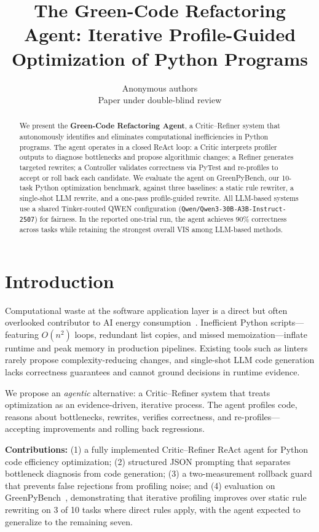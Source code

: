 \documentclass{article}
\title{\textbf{The Green-Code Refactoring Agent: Iterative Profile-Guided Optimization of Python Programs}}
\author{
Anonymous authors\\
Paper under double-blind review
}
\date{}
\begin{document}
\maketitle

\begin{abstract}
We present the \textbf{Green-Code Refactoring Agent}, a Critic--Refiner system that autonomously identifies and eliminates computational inefficiencies in Python programs. The agent operates in a closed ReAct loop: a Critic interprets profiler outputs to diagnose bottlenecks and propose algorithmic changes; a Refiner generates targeted rewrites; a Controller validates correctness via PyTest and re-profiles to accept or roll back each candidate. We evaluate the agent on GreenPyBench, our 10-task Python optimization benchmark, against three baselines: a static rule rewriter, a single-shot LLM rewrite, and a one-pass profile-guided rewrite. All LLM-based systems use a shared Tinker-routed QWEN configuration (\texttt{Qwen/Qwen3-30B-A3B-Instruct-2507}) for fairness. In the reported one-trial run, the agent achieves 90\% correctness across tasks while retaining the strongest overall VIS among LLM-based methods.
\end{abstract}

\section{Introduction}

Computational waste at the software application layer is a direct but often overlooked contributor to AI energy consumption~\cite{strubell2019energy,schwartz2020green}. Inefficient Python scripts---featuring $O(n^2)$ loops, redundant list copies, and missed memoization---inflate runtime and peak memory in production pipelines. Existing tools such as linters rarely propose complexity-reducing changes, and single-shot LLM code generation lacks correctness guarantees and cannot ground decisions in runtime evidence.

We propose an \emph{agentic} alternative: a Critic--Refiner system that treats optimization as an evidence-driven, iterative process. The agent profiles code, reasons about bottlenecks, rewrites, verifies correctness, and re-profiles---accepting improvements and rolling back regressions.

\textbf{Contributions:} (1) a fully implemented Critic--Refiner ReAct agent for Python code efficiency optimization; (2) structured JSON prompting that separates bottleneck diagnosis from code generation; (3) a two-measurement rollback guard that prevents false rejections from profiling noise; and (4) evaluation on GreenPyBench~\cite{huamani2026greenpybench}, demonstrating that iterative profiling improves over static rule rewriting on 3 of 10 tasks where direct rules apply, with the agent expected to generalize to the remaining seven.
\end{document}
